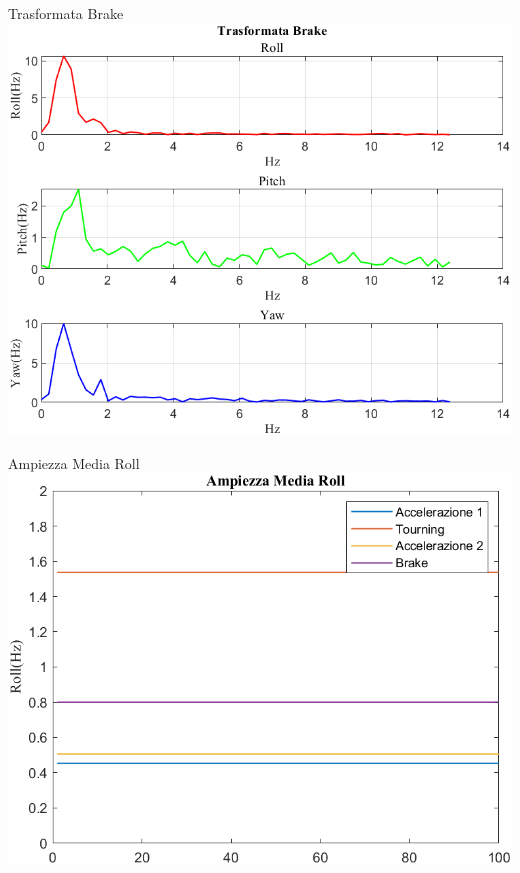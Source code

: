\documentclass[beamer]{standalone}
\begin{document}
	\begin{frame}{{Trasformata Brake}}
		\centering\includegraphics[height=.8\textheight]{figure/VAng/Trasformata/Trasformata Brake}
	\end{frame}
	
	\begin{frame}{{Ampiezza Media Roll}}
		\centering\includegraphics[height=.8\textheight]{figure/VAng/Trasformata/Ampiezza MediaRoll}
	\end{frame}
	
\end{document}
